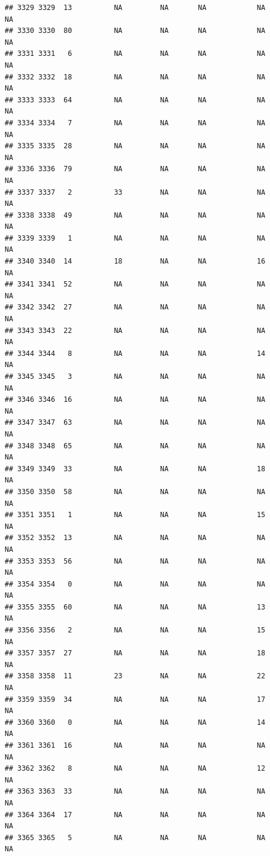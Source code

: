 \documentclass[man]{apa6}
\begin{document}
\begin{verbatim}
## 3329 3329  13          NA         NA       NA            NA       NA
## 3330 3330  80          NA         NA       NA            NA       NA
## 3331 3331   6          NA         NA       NA            NA       NA
## 3332 3332  18          NA         NA       NA            NA       NA
## 3333 3333  64          NA         NA       NA            NA       NA
## 3334 3334   7          NA         NA       NA            NA       NA
## 3335 3335  28          NA         NA       NA            NA       NA
## 3336 3336  79          NA         NA       NA            NA       NA
## 3337 3337   2          33         NA       NA            NA       NA
## 3338 3338  49          NA         NA       NA            NA       NA
## 3339 3339   1          NA         NA       NA            NA       NA
## 3340 3340  14          18         NA       NA            16       NA
## 3341 3341  52          NA         NA       NA            NA       NA
## 3342 3342  27          NA         NA       NA            NA       NA
## 3343 3343  22          NA         NA       NA            NA       NA
## 3344 3344   8          NA         NA       NA            14       NA
## 3345 3345   3          NA         NA       NA            NA       NA
## 3346 3346  16          NA         NA       NA            NA       NA
## 3347 3347  63          NA         NA       NA            NA       NA
## 3348 3348  65          NA         NA       NA            NA       NA
## 3349 3349  33          NA         NA       NA            18       NA
## 3350 3350  58          NA         NA       NA            NA       NA
## 3351 3351   1          NA         NA       NA            15       NA
## 3352 3352  13          NA         NA       NA            NA       NA
## 3353 3353  56          NA         NA       NA            NA       NA
## 3354 3354   0          NA         NA       NA            NA       NA
## 3355 3355  60          NA         NA       NA            13       NA
## 3356 3356   2          NA         NA       NA            15       NA
## 3357 3357  27          NA         NA       NA            18       NA
## 3358 3358  11          23         NA       NA            22       NA
## 3359 3359  34          NA         NA       NA            17       NA
## 3360 3360   0          NA         NA       NA            14       NA
## 3361 3361  16          NA         NA       NA            NA       NA
## 3362 3362   8          NA         NA       NA            12       NA
## 3363 3363  33          NA         NA       NA            NA       NA
## 3364 3364  17          NA         NA       NA            NA       NA
## 3365 3365   5          NA         NA       NA            NA       NA

\end{verbatim}
\end{document}
